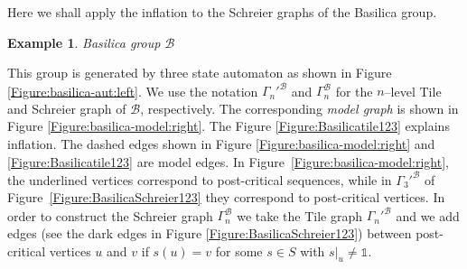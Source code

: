 \documentclass{article}
\newtheorem{myexa}{Example}[section]
\newcommand{\B}{\mathcal{B}}
\newcommand{\G}{\Gamma}
\newcommand{\id}{\mathds{1}}
\begin{document}
Here we shall apply the inflation to the Schreier graphs of the Basilica group. 
\begin{myexa} Basilica group $\B$\label{basilica-ex} \end{myexa} 
This group is generated by three state automaton as shown in Figure  \ref{Figure:basilica-aut:left}. We use the notation $\G_n'^{\B}$ and $\G_n^{\B}$ for the $n$--level Tile and Schreier graph of $\B$, respectively. The corresponding {\it model graph} is shown in Figure \ref{Figure:basilica-model:right}. The Figure \ref{Figure:Basilicatile123} explains inflation. The dashed edges shown in Figure \ref{Figure:basilica-model:right} and \ref{Figure:Basilicatile123} are model edges. In Figure~\ref{Figure:basilica-model:right}, the underlined vertices correspond to post-critical sequences, while in $\G_3'^{\B}$ of Figure~\ref{Figure:BasilicaSchreier123} they correspond to post-critical vertices. In order to construct the Schreier graph $\G_n^{\B}$ we take the Tile graph $\G_n'^{\B}$ and we add edges (see the dark edges in Figure \ref{Figure:BasilicaSchreier123}) between post-critical vertices $u$ and $v$ if $s(u) = v$ for some $s \in S$ with $s|_u \neq \id$. 
\end{document}
